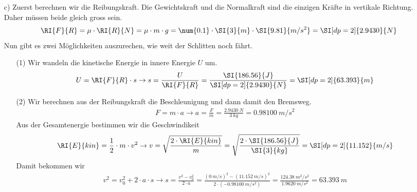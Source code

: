 \begin{aufgabe}
\begin{loesung}
\begin{itemize}
\item [c)] Zuerst berechnen wir die Reibungskraft. Die Gewichtskraft und die Normalkraft sind die einzigen Kräfte in vertikale Richtung.
	Daher müssen beide gleich gross sein.
	\begin{eqnarray*}
		\RI{F}{R} = \mu\cdot\RI{R}{N} = \mu\cdot m\cdot g =\num{0.1}\cdot\SI{3}{m}\cdot\SI{9.81}{m/s^2}=\SI[dp=2]{2.9430}{N}
	\end{eqnarray*}
	Nun gibt es zwei Möglichkeiten auszurechen, wie weit der Schlitten noch fährt.
	\begin{itemize}
		\item [(1)] Wir wandeln die kinetische Energie in innere Energie $U$ um.
			\begin{eqnarray*}
				U = \RI{F}{R}\cdot s \to s=\frac{U}{\RI{F}{R}}=\frac{\SI{186.56}{J}}{\SI[dp=2]{2.9430}{N}} =\SI[dp=2]{63.393}{m}
			\end{eqnarray*}
		\item [(2)] Wir berechnen aus der Reibungskraft die Beschleunigung und dann damit den Bremsweg.
			\begin{eqnarray*}
				F=m\cdot a \to a=\frac{F}{m}=\frac{\SI[dp=2]{2.9430}{N}}{\SI{3}{kg}}=\SI[dp=2]{0.98100}{m/s^2}
			\end{eqnarray*}
Aus der Gesamtenergie bestimmen wir die Geschwindikeit
\begin{eqnarray*}
	\RI{E}{kin}=\frac{1}{2}\cdot m\cdot v^2 \to v=\sqrt{\frac{2\cdot \RI{E}{kin}}{m}}=\sqrt{\frac{2\cdot\SI{186.56}{J}}{\SI{3}{kg}}}=\SI[dp=2]{11.152}{m/s}
\end{eqnarray*}
Damit bekommen wir
\begin{eqnarray*}
	v^2 = v_0^2 +2\cdot a\cdot s \to s=\frac{v^2 -v_0^2}{2\cdot a}=\frac{(\SI{0}{m/s})^2-(\SI[dp=2]{11.152}{m/s})^2}{2\cdot(\SI[dp=2]{-0.98100}{m/s^2})}=\frac{\SI[dp=2]{124.38}{m^2/s^2}}{\SI[dp=2]{1.9620}{m/s^2}}=\SI[dp=2]{63.393}{m}
\end{eqnarray*}
	\end{itemize}
		\end{itemize}
	\end{loesung}

\end{aufgabe}

